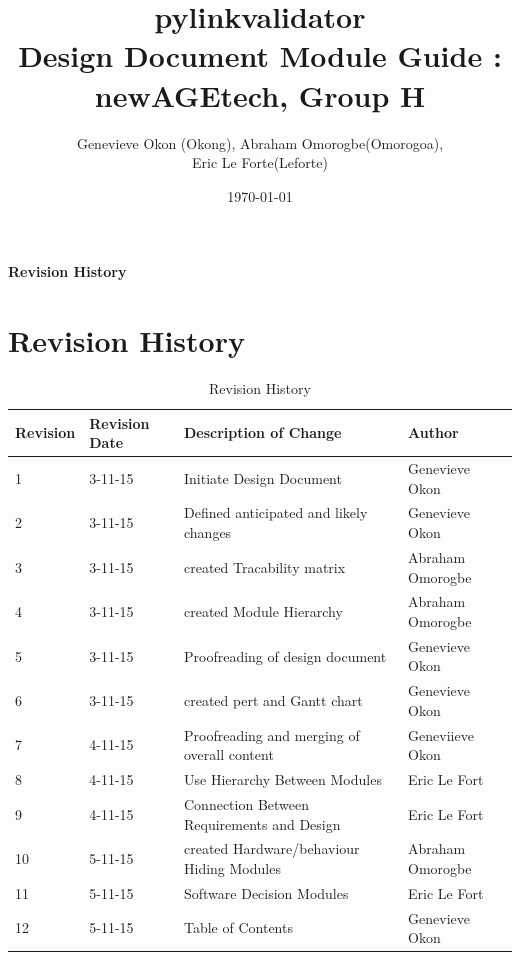 \documentclass[titlepage]{article}
\begin{document}
\title{pylinkvalidator \\
 Design Document Module Guide : newAGEtech, Group H }
\author{Genevieve Okon (Okong), Abraham Omorogbe(Omorogoa),\\
 Eric Le Forte(Leforte)}
\date{\today}
\maketitle


\tableofcontents
\listoffigures
\listoftables

\textbf{Revision History} \\ \normalsize
\pagebreak

\section{Revision History}
\begin{table}[h!]
	\begin{tabular}{| p{5cm} | p{5cm} | p{5cm} |p{5cm} |}    \hline
Revision  &Revision Date &Description of Change &Author\\ \hline
1& 3-11-15& Initiate Design Document&Genevieve Okon\\ \hline
2& 3-11-15& Defined anticipated and likely changes&Genevieve Okon\\ \hline
3& 3-11-15& created Tracability matrix &Abraham Omorogbe\\ \hline
4& 3-11-15& created  Module Hierarchy&Abraham Omorogbe\\ \hline
5& 3-11-15&Proofreading of design document&Genevieve Okon\\ \hline
6& 3-11-15&created pert and Gantt chart&Genevieve Okon\\ \hline
7& 4-11-15& Proofreading and merging of overall content&Geneviieve Okon\\ \hline
8& 4-11-15& Use Hierarchy Between Modules&Eric Le Fort\\ \hline
9& 4-11-15&Connection Between Requirements and Design&Eric Le Fort\\ \hline
10& 5-11-15& created Hardware/behaviour Hiding Modules&Abraham Omorogbe\\ \hline
11& 5-11-15& Software Decision Modules&Eric Le Fort\\ \hline
12& 5-11-15& Table of Contents&Genevieve Okon\\ \hline
       \end{tabular}
       
       \caption{Revision History}
       \label{table:Revision History}
\end{table}
\end{document}
